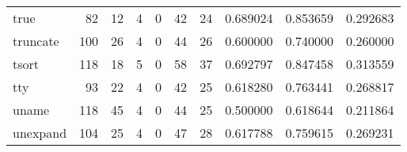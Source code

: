 \begin{longtable}{lrrrrrrrrr}
true      &                                                 82 &                                                 12 &                                                  4 &                                                  0 &                                                 42 &                                                 24 &                                           0.689024 &                               0.853659 &                             0.292683 \\
truncate  &                                                100 &                                                 26 &                                                  4 &                                                  0 &                                                 44 &                                                 26 &                                           0.600000 &                               0.740000 &                             0.260000 \\
tsort     &                                                118 &                                                 18 &                                                  5 &                                                  0 &                                                 58 &                                                 37 &                                           0.692797 &                               0.847458 &                             0.313559 \\
tty       &                                                 93 &                                                 22 &                                                  4 &                                                  0 &                                                 42 &                                                 25 &                                           0.618280 &                               0.763441 &                             0.268817 \\
uname     &                                                118 &                                                 45 &                                                  4 &                                                  0 &                                                 44 &                                                 25 &                                           0.500000 &                               0.618644 &                             0.211864 \\
unexpand  &                                                104 &                                                 25 &                                                  4 &                                                  0 &                                                 47 &                                                 28 &                                           0.617788 &                               0.759615 &                             0.269231 \\

\end{longtable}
